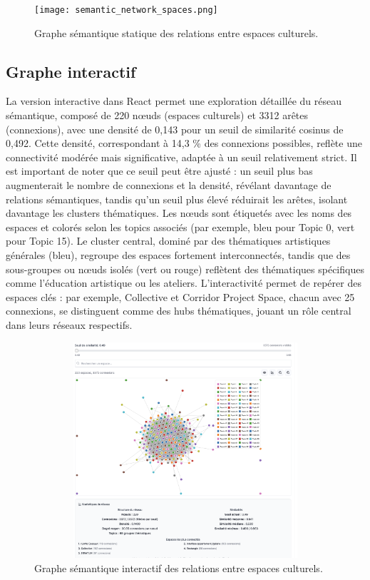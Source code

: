 \documentclass[mstat,12pt]{unswthesis}
\begin{document}
\begin{figure}[H]
    \centering
    \texttt{[image: semantic\_network\_spaces.png]}
    \caption{Graphe sémantique statique des relations entre espaces culturels. }
    \label{fig:enquete}
\end{figure}

\subsection{Graphe interactif }

La version interactive dans React permet une exploration détaillée du réseau sémantique, 
composé de 220 nœuds (espaces culturels) et 3312 arêtes (connexions), avec une densité de 
0,143 pour un seuil de similarité cosinus de 0,492. Cette densité, correspondant à 14,3 \% des 
connexions possibles, reflète une connectivité modérée mais significative, adaptée à un seuil 
relativement strict. Il est important de noter que ce seuil peut être ajusté : un seuil plus bas 
augmenterait le nombre de connexions et la densité, révélant davantage de relations 
sémantiques, tandis qu’un seuil plus élevé réduirait les arêtes, isolant davantage les clusters 
thématiques. Les nœuds sont étiquetés avec les noms des espaces et colorés selon les topics 
associés (par exemple, bleu pour Topic 0, vert pour Topic 15). Le cluster central, dominé par 
des thématiques artistiques générales (bleu), regroupe des espaces fortement interconnectés, 
tandis que des sous-groupes ou nœuds isolés (vert ou rouge) reflètent des thématiques 
spécifiques comme l’éducation artistique ou les ateliers. L’interactivité permet de repérer des 
espaces clés : par exemple, Collective et Corridor Project Space, chacun avec 25 
connexions, se distinguent comme des hubs thématiques, jouant un rôle central dans leurs 
réseaux respectifs.

\begin{figure}[H]
    \centering
    \includegraphics[width=15cm,height=8cm]{semantic_network_spaces2.png}
    \caption{Graphe sémantique interactif des relations entre espaces culturels. }
    \label{fig:enquete}
\end{figure}
\end{document}
